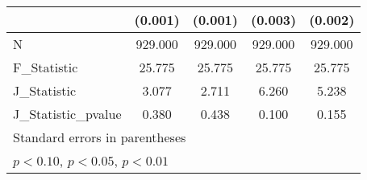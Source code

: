 {\begin{tabular}{l*{4}{c}}
            &     (0.001)         &     (0.001)         &     (0.003)         &     (0.002)         \\
\hline
N           &     929.000         &     929.000         &     929.000         &     929.000         \\
F\_Statistic &      25.775         &      25.775         &      25.775         &      25.775         \\
J\_Statistic &       3.077         &       2.711         &       6.260         &       5.238         \\
J\_Statistic\_pvalue&       0.380         &       0.438         &       0.100         &       0.155         \\
\hline\hline
\multicolumn{5}{l}{\footnotesize Standard errors in parentheses}\\
\multicolumn{5}{l}{\footnotesize \sym{*} \(p<0.10\), \sym{**} \(p<0.05\), \sym{***} \(p<0.01\)}\\
\end{tabular}
}
